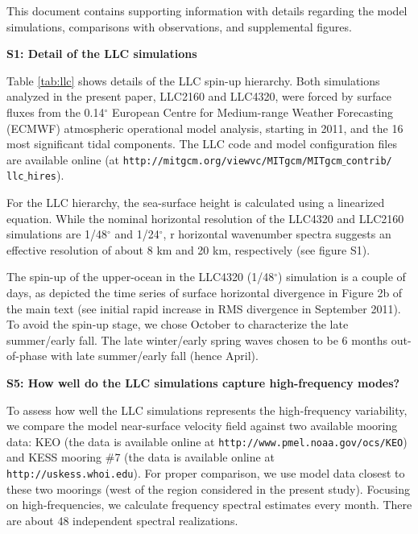 \documentclass[draft,grl]{agutexSI}
\begin{document}
\begin{article}
This document contains supporting information with details regarding the model
simulations, comparisons with observations, and supplemental figures.


\noindent\textbf{S1: Detail of the LLC simulations}

Table \ref{tab:llc} shows details of the LLC spin-up hierarchy.
Both simulations analyzed in the present paper, LLC2160 and LLC4320,
were forced by surface fluxes from the 0.14$^\circ$ European Centre for
Medium-range Weather Forecasting (ECMWF) atmospheric operational model analysis,
 starting in 2011, and the 16 most significant  tidal components.
The LLC code and model configuration files are available online
(at \texttt{http://mitgcm.org/viewvc/MITgcm/MITgcm$\_$contrib/
llc$\_$hires}).

For the LLC hierarchy, the sea-surface height is calculated
using a linearized equation. While the nominal horizontal resolution  of the
LLC4320 and LLC2160 simulations are 1/48$^\circ$ and 1/24$^\circ$, r
horizontal wavenumber spectra suggests an effective resolution of about 8 km and 20 km,
 respectively (see figure S1).

The spin-up of the upper-ocean in the LLC4320 (1/48$^\circ$) simulation is
a couple of days, as depicted the time series of surface horizontal divergence
in Figure 2b of the main text (see initial rapid increase in RMS divergence in
September 2011). To avoid the spin-up stage, we chose October to characterize the
late summer/early fall. The late winter/early spring waves chosen to be 6 months
out-of-phase with late summer/early fall (hence April).

\noindent\textbf{S5: How well do the LLC simulations capture high-frequency modes?}

To assess how well the LLC simulations represents the high-frequency variability,
we compare the model near-surface velocity field against two available
mooring data: KEO (the data is available online at \texttt{http://www.pmel.noaa.gov/ocs/KEO})
and KESS mooring $\#$7 (the data is available online at \texttt{http://uskess.whoi.edu}).
For proper comparison, we use model data closest to these two moorings (west of
the region considered in the present study). Focusing on high-frequencies, we
calculate frequency spectral estimates every month. There are about 48 independent
spectral realizations.


\end{article}
\end{document}
